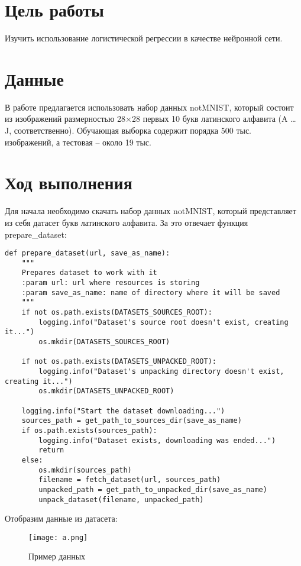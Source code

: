 \section{Цель работы}

Изучить использование логистической регрессии в качестве нейронной сети.

\section{Данные}

В работе предлагается использовать набор данных notMNIST, который состоит из изображений размерностью 28×28 первых 10 букв латинского алфавита (A … J, соответственно).
Обучающая выборка содержит порядка 500 тыс. изображений, а тестовая – около 19 тыс.


\section{Ход выполнения}

Для начала необходимо скачать набор данных notMNIST, который представляет из себя датасет букв латинского алфавита. За это отвечает функция prepare\_dataset:

\begin{lstlisting}
def prepare_dataset(url, save_as_name):
    """
    Prepares dataset to work with it
    :param url: url where resources is storing
    :param save_as_name: name of directory where it will be saved
    """
    if not os.path.exists(DATASETS_SOURCES_ROOT):
        logging.info("Dataset's source root doesn't exist, creating it...")
        os.mkdir(DATASETS_SOURCES_ROOT)

    if not os.path.exists(DATASETS_UNPACKED_ROOT):
        logging.info("Dataset's unpacking directory doesn't exist, creating it...")
        os.mkdir(DATASETS_UNPACKED_ROOT)

    logging.info("Start the dataset downloading...")
    sources_path = get_path_to_sources_dir(save_as_name)
    if os.path.exists(sources_path):
        logging.info("Dataset exists, downloading was ended...")
        return
    else:
        os.mkdir(sources_path)
        filename = fetch_dataset(url, sources_path)
        unpacked_path = get_path_to_unpacked_dir(save_as_name)
        unpack_dataset(filename, unpacked_path)
\end{lstlisting}

Отобразим данные из датасета:

\begin{figure}[h]
\centering
	\texttt{[image: a.png]}
	\caption{Пример данных}
	\label{sec:purpose:payings}
\end{figure}

